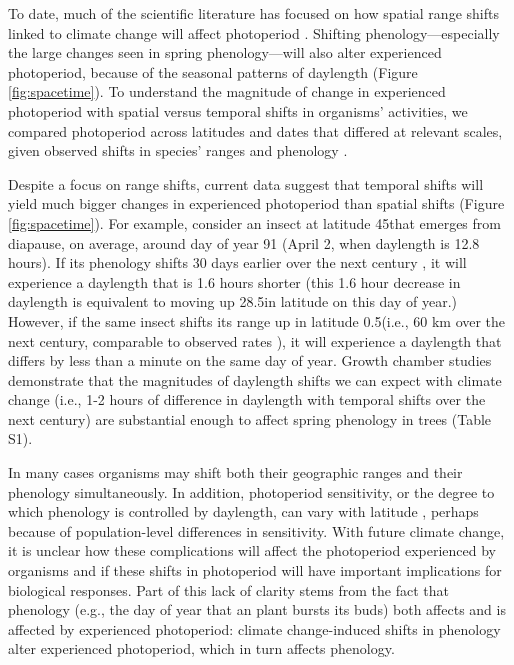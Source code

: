 \documentclass{article}
\begin{document}
\par To date, much of the scientific literature has focused on how spatial range shifts linked to climate change will affect photoperiod \citep[e.g.,] []{saikkonen2012,way2015}. Shifting phenology---especially the large changes seen in spring phenology---will also alter experienced photoperiod, because of the seasonal patterns of daylength (Figure \ref{fig:spacetime}). To understand the magnitude of change in experienced photoperiod with spatial versus temporal shifts in organisms' activities, we compared photoperiod across latitudes and dates that differed at relevant scales, given observed shifts in species' ranges and phenology \citep{parmesan2003,chen2011}. %

\par Despite a focus on range shifts, current data suggest that temporal shifts will yield much bigger changes in experienced photoperiod than spatial shifts (Figure \ref{fig:spacetime}). For example, consider an insect at latitude 45\degree that emerges from diapause, on average, around day of year 91 (April 2, when daylength is 12.8 hours). If its phenology shifts 30 days earlier over the next century \citep[][i.e., a rate of ~3 days per decade, as has been observed]{parmesan2003}, it will experience a daylength that is 1.6 hours shorter (this 1.6 hour decrease in daylength is equivalent to moving up 28.5\degree  in latitude on this day of year.) However, if the same insect shifts its range up in latitude 0.5\degree  (i.e., 60 km over the next century,  comparable to observed rates \citep{parmesan2003, chen2011}), it will experience a daylength that differs by less than a minute on the same day of year. Growth chamber studies demonstrate that the magnitudes of daylength shifts we can expect with climate change (i.e., 1-2 hours of difference in daylength with temporal shifts over the next century) are substantial enough to affect spring phenology in trees (Table S1).  

\par In many cases organisms may shift both their geographic ranges and their phenology simultaneously. In addition, photoperiod sensitivity, or the degree to which phenology is controlled by daylength, can vary with latitude \citep{Howe:1996,saikkonen2012,Partanen:2005aa,Vihera-Aarnio:2006aa,Caffarra:2011b,gauzere2017}, perhaps because of population-level differences in sensitivity. With future climate change, it is unclear how these complications will affect the photoperiod experienced by organisms and if these shifts in photoperiod will have important implications for biological responses. Part of this lack of clarity stems from the fact that phenology (e.g., the day of year that an plant bursts its buds) both affects and is affected by experienced photoperiod: climate change-induced shifts in phenology alter experienced photoperiod, which in turn affects phenology.
\end{document}
